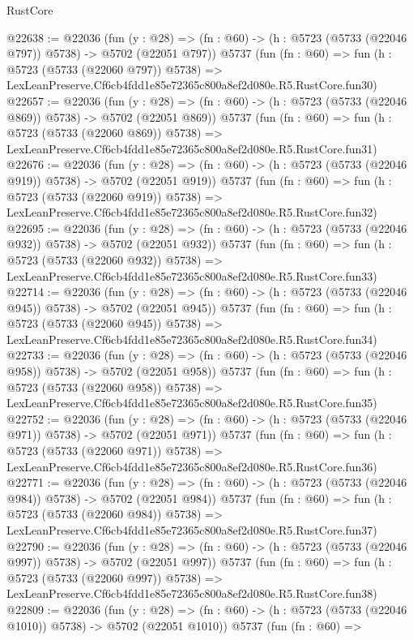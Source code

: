 \begin{lexlean}{RustCore}
\begin{coremodule}
@22638 := @22036
    (fun (y : @28) => (fn : @60) -> (h : @5723 (@5733 (@22046 @797)) @5738) -> @5702 (@22051 @797))
    @5737
    (fun (fn : @60) =>
    fun (h : @5723 (@5733 (@22060 @797)) @5738) =>
    LexLeanPreserve.Cf6cb4fdd1e85e72365c800a8ef2d080e.R5.RustCore.fun30)
@22657 := @22036
    (fun (y : @28) => (fn : @60) -> (h : @5723 (@5733 (@22046 @869)) @5738) -> @5702 (@22051 @869))
    @5737
    (fun (fn : @60) =>
    fun (h : @5723 (@5733 (@22060 @869)) @5738) =>
    LexLeanPreserve.Cf6cb4fdd1e85e72365c800a8ef2d080e.R5.RustCore.fun31)
@22676 := @22036
    (fun (y : @28) => (fn : @60) -> (h : @5723 (@5733 (@22046 @919)) @5738) -> @5702 (@22051 @919))
    @5737
    (fun (fn : @60) =>
    fun (h : @5723 (@5733 (@22060 @919)) @5738) =>
    LexLeanPreserve.Cf6cb4fdd1e85e72365c800a8ef2d080e.R5.RustCore.fun32)
@22695 := @22036
    (fun (y : @28) => (fn : @60) -> (h : @5723 (@5733 (@22046 @932)) @5738) -> @5702 (@22051 @932))
    @5737
    (fun (fn : @60) =>
    fun (h : @5723 (@5733 (@22060 @932)) @5738) =>
    LexLeanPreserve.Cf6cb4fdd1e85e72365c800a8ef2d080e.R5.RustCore.fun33)
@22714 := @22036
    (fun (y : @28) => (fn : @60) -> (h : @5723 (@5733 (@22046 @945)) @5738) -> @5702 (@22051 @945))
    @5737
    (fun (fn : @60) =>
    fun (h : @5723 (@5733 (@22060 @945)) @5738) =>
    LexLeanPreserve.Cf6cb4fdd1e85e72365c800a8ef2d080e.R5.RustCore.fun34)
@22733 := @22036
    (fun (y : @28) => (fn : @60) -> (h : @5723 (@5733 (@22046 @958)) @5738) -> @5702 (@22051 @958))
    @5737
    (fun (fn : @60) =>
    fun (h : @5723 (@5733 (@22060 @958)) @5738) =>
    LexLeanPreserve.Cf6cb4fdd1e85e72365c800a8ef2d080e.R5.RustCore.fun35)
@22752 := @22036
    (fun (y : @28) => (fn : @60) -> (h : @5723 (@5733 (@22046 @971)) @5738) -> @5702 (@22051 @971))
    @5737
    (fun (fn : @60) =>
    fun (h : @5723 (@5733 (@22060 @971)) @5738) =>
    LexLeanPreserve.Cf6cb4fdd1e85e72365c800a8ef2d080e.R5.RustCore.fun36)
@22771 := @22036
    (fun (y : @28) => (fn : @60) -> (h : @5723 (@5733 (@22046 @984)) @5738) -> @5702 (@22051 @984))
    @5737
    (fun (fn : @60) =>
    fun (h : @5723 (@5733 (@22060 @984)) @5738) =>
    LexLeanPreserve.Cf6cb4fdd1e85e72365c800a8ef2d080e.R5.RustCore.fun37)
@22790 := @22036
    (fun (y : @28) => (fn : @60) -> (h : @5723 (@5733 (@22046 @997)) @5738) -> @5702 (@22051 @997))
    @5737
    (fun (fn : @60) =>
    fun (h : @5723 (@5733 (@22060 @997)) @5738) =>
    LexLeanPreserve.Cf6cb4fdd1e85e72365c800a8ef2d080e.R5.RustCore.fun38)
@22809 := @22036
    (fun (y : @28) =>
    (fn : @60) -> (h : @5723 (@5733 (@22046 @1010)) @5738) -> @5702 (@22051 @1010))
    @5737
    (fun (fn : @60) =>

\end{coremodule}
\end{lexlean}
